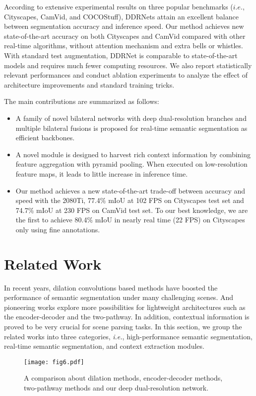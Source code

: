 \documentclass[journal]{IEEEtran}
\begin{document}
According to extensive experimental results on three popular benchmarks ($i.e.$, Cityscapes, CamVid, and COCOStuff), DDRNets attain an excellent balance between segmentation accuracy and inference speed. Our method achieves new state-of-the-art accuracy on both Cityscapes and CamVid compared with other real-time algorithms, without attention mechanism and extra bells or whistles. With standard test augmentation, DDRNet is comparable to state-of-the-art models and requires much fewer computing resources. We also report statistically relevant performances and conduct ablation experiments to analyze the effect of architecture improvements and standard training tricks.

The main contributions are summarized as follows:
\begin{itemize}
  \item A family of novel bilateral networks with deep dual-resolution branches and multiple bilateral fusions is proposed for real-time semantic segmentation as efficient backbones.
  \item A novel module is designed to harvest rich context information by combining feature aggregation with pyramid pooling. When executed on low-resolution feature maps, it leads to little increase in inference time.
  \item Our method achieves a new state-of-the-art trade-off between accuracy and speed with the 2080Ti, 77.4$\%$ mIoU at 102 FPS on Cityscapes test set and 74.7$\%$ mIoU at 230 FPS on CamVid test set. To our best knowledge, we are the first to achieve 80.4$\%$ mIoU in nearly real time (22 FPS) on Cityscapes only using fine annotations.

\end{itemize}
\section{Related Work}

In recent years, dilation convolutions based methods have boosted the performance of semantic segmentation under many challenging scenes. And pioneering works explore more possibilities for lightweight architectures such as the encoder-decoder and the two-pathway. In addition, contextual information is proved to be very crucial for scene parsing tasks. In this section, we group the related works into three categories, \emph{i.e.}, high-performance semantic segmentation, real-time semantic segmentation, and context extraction modules.

\begin{figure*}[!t]
\centerline{\texttt{[image: fig6.pdf]}}
\caption{A comparison about dilation methods, encoder-decoder methods, two-pathway methods and our deep dual-resolution network.}
\label{fig6}
\end{figure*}
\end{document}
